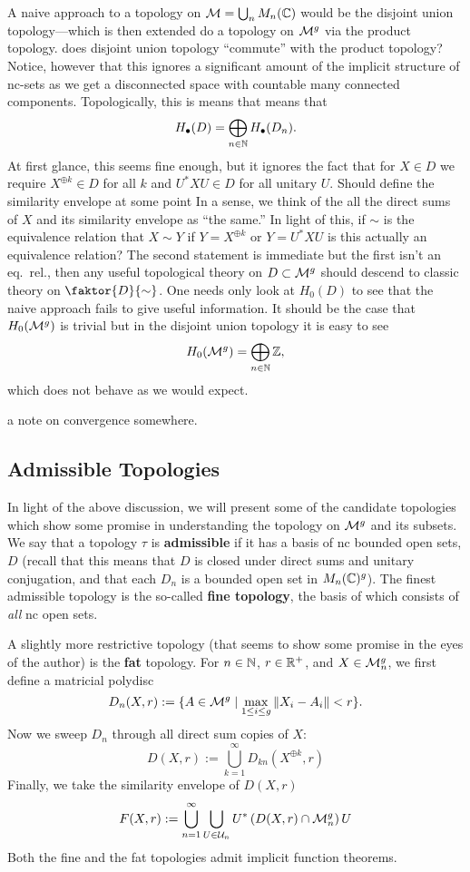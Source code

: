 A naive approach to a topology on \(\mathcal{M} = \bigcup_n M_n(\mathbb{C})\) would be the
disjoint union topology---which is then extended do a topology on \(\mathcal{M}^g\) via
the product topology. {\color{red} does disjoint union topology ``commute'' with
the product topology?} Notice, however that this ignores a significant amount of
the implicit structure of nc-sets as we get a disconnected space with countable
many connected components. Topologically, this is means that means that
\[
  H_\bullet (D) = \bigoplus_{n \in \mathbb{N} } H_\bullet(D_n).
\]
At first glance, this seems fine enough, but it ignores the fact that for
\(X \in D\) we require \(X^{\oplus k} \in D\) for all \(k\) and \(U^*XU \in D\)
for all unitary \(U\). {\color{blue} Should define the similarity envelope at
  some point} In a sense, we think of the all the direct sums of \(X\) and its
similarity envelope as ``the same.'' In light of this, if \(\sim\) is the
equivalence relation that \(X\sim Y\) if \(Y = X^{\oplus k}\) or \(Y = U^*XU\)
{\color{red} is this actually an equivalence relation? The second statement is
  immediate but the first isn't an eq.\ rel.},
then any useful topological theory on \(D \subset \mathcal{M}^g\) should descend to
classic theory on \(\faktor{D}{\sim}\). One needs only look at \(H_0(D)\) to see
that the naive approach fails to give useful information. It should be the case
that \(H_0(\mathcal{M}^{g} )\) is trivial but in the disjoint union topology it is easy
to see
\[
  H_0(\mathcal{M}^{g} ) = \bigoplus_{n \in \mathbb{N} } \mathbb{Z} ,
\]
which does not behave as we would expect.

{\color{blue} a note on convergence somewhere.}

\subsection{Admissible Topologies}%
\label{sec:admtopo}

In light of the above discussion, we will present some of the candidate
topologies which show some promise in understanding the topology on \(\mathcal{M}^g\)
and its subsets.
We say that a topology \(\tau\) is \textbf{admissible} if it has a basis of nc
bounded open sets, \(D\) (recall that this means that \(D\) is closed under
direct sums and unitary conjugation, and that each \(D_n\) is a bounded open set
in \(M_n(\mathbb{C})^g\)). The finest admissible topology is the so-called \textbf{fine
  topology},
the basis of which consists of \emph{all} nc open sets.

A slightly more restrictive topology (that seems to show some promise in the eyes
of the author) is the \textbf{fat} topology. For \(n \in \mathbb{N} \),
\(r \in \mathbb{R} ^+\), and \(X \in \mathcal{M}^g_n\), we first define a matricial polydisc
\[
  D_n(X,r) := \{A \in \mathcal{M}^g \mid \max_{1\leq i\leq g} \| X_i-A_i \| <r\}.
\]
Now we sweep \(D_n\) through all direct sum copies of \(X\):
\[
  D(X,r) := \bigcup_{k=1}^\infty D_{kn} (X^{\oplus k},r)
\]
Finally, we take the similarity envelope of \(D(X,r)\)
\[
  F(X,r) :=  \bigcup_{n=1}^\infty \bigcup_{U \in \mathcal{U}_n} U^* \left( D(X,r) \cap \mathcal{M}^g_n \right) U
\]
Both the fine and the fat topologies admit implicit function theorems.

